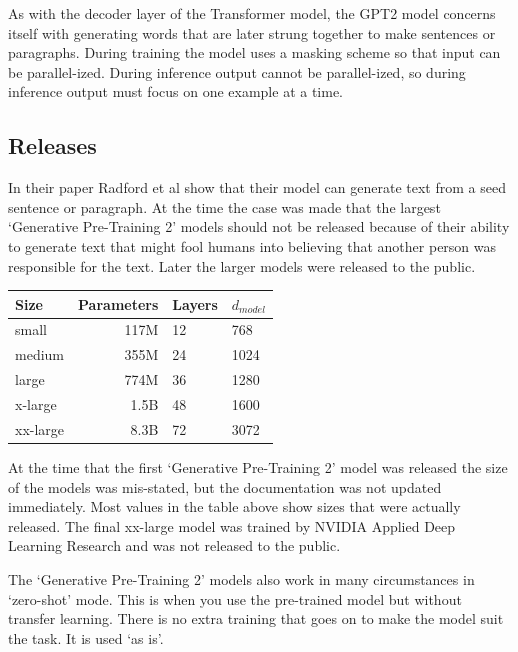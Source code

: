As with the decoder layer of the Transformer model, the GPT2 model concerns itself with generating words that are later strung together to make sentences or paragraphs. During training the model uses a masking scheme so that input can be parallel-ized. During inference output cannot be parallel-ized, so during inference output must focus on one example at a time.

\subsection{Releases}
In their paper Radford et al \cite{radford2019language} show that their model can generate text from a seed sentence or paragraph. At the time the case was made that the largest `Generative Pre-Training 2' models should not be released because of their ability to generate text that might fool humans into believing that another person was responsible for the text. Later the larger models were released to the public.

\begin{center}

\begin{tabular}{lrll}
	Size & Parameters & Layers & $d_{model}$ \\
	\hline
	small & 117M       & 12     & 768          \\
	medium & 355M       & 24     & 1024         \\
	large & 774M       & 36     & 1280         \\
	x-large & 1.5B     & 48     & 1600 \\
	xx-large & 8.3B   &  72 &   3072 
\end{tabular}

	
\end{center}

At the time that the first `Generative Pre-Training 2' model was released the size of the models was mis-stated, but the documentation was not updated immediately. Most values in the table above show sizes that were actually released. The final xx-large model was trained by NVIDIA Applied Deep Learning Research \cite{2019NVIDIAadlr} and was not released to the public.

The `Generative Pre-Training 2' models also work in many circumstances in `zero-shot' mode. This is when you use the pre-trained model but without transfer learning. There is no extra training that goes on to make the model suit the task. It is used `as is'.

